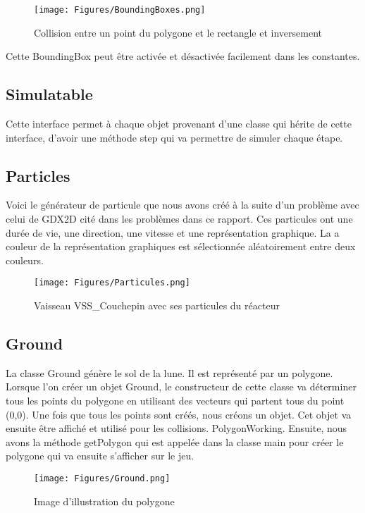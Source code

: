 \begin{figure}[h]
 \centering
 \texttt{[image: Figures/BoundingBoxes.png]}
 \caption{Collision entre un point du polygone et le rectangle et inversement}
 \label{figure:BoundingBoxes}
\end{figure}

Cette BoundingBox peut être activée et désactivée facilement dans les constantes.

\subsection{Simulatable}
Cette interface permet à chaque objet provenant d’une classe qui hérite de cette interface, d’avoir une méthode step qui va permettre de simuler chaque étape.

\subsection{Particles}
Voici le générateur de particule que nous avons créé à la suite d’un problème avec celui de GDX2D cité dans les problèmes dans ce rapport. Ces particules ont une durée de vie, une direction, une vitesse et une représentation graphique. La a couleur de la représentation graphiques est sélectionnée aléatoirement entre deux couleurs.

\begin{figure}[h]
 \centering
 \texttt{[image: Figures/Particules.png]}
 \caption{Vaisseau VSS\_Couchepin avec ses particules du réacteur}
 \label{figure:Particules}
\end{figure}

\subsection{Ground}
La classe Ground génère le sol de la lune. Il est représenté par un polygone. Lorsque l’on créer un objet Ground, le constructeur de cette classe va déterminer tous les points du polygone en utilisant des vecteurs qui partent tous du point (0,0). Une fois que tous les points sont créés, nous créons un objet. Cet objet va ensuite être affiché et utilisé pour les collisions.  PolygonWorking. Ensuite, nous avons la méthode getPolygon qui est appelée dans la classe main pour créer le polygone qui va ensuite s’afficher sur le jeu.

\begin{figure}[h]
 \centering
 \texttt{[image: Figures/Ground.png]}
 \caption{Image d'illustration du polygone}
 \label{figure:Ground}
\end{figure}

